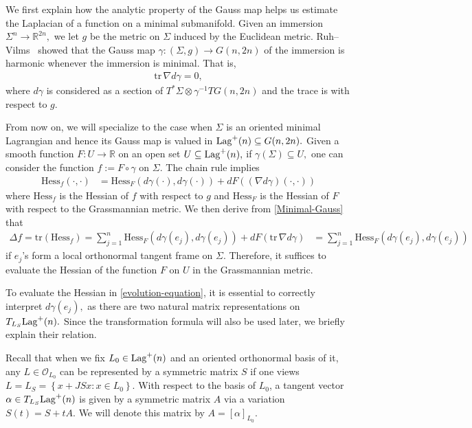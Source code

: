 \documentclass[11pt]{amsart}
\numberwithin{equation}{section}
\theoremstyle{definition}
\theoremstyle{definition}
\newcommand{\set}[1]{\left\{#1\right\}}
\newcommand{\pr}[1]{\left(#1\right)}
\newcommand{\bb}[1]{\mathbb{#1}} \newcommand{\td}[1]{\widetilde{#1}}
\newcommand{\tr}{\text{tr}}
\newcommand{\D}{\Delta}
\newcommand{\Hess}{\text{Hess}}
\newcommand{\n}{\nabla}
\newcommand{\sbst}{\subseteq}
\begin{document}
We first explain how the analytic property of the Gauss map helps us estimate the Laplacian of a function on a minimal submanifold.
Given an immersion $\Sigma^n\to\bb R^{2n},$ we let $g$ be the metric on $\Sigma$ induced by the Euclidean metric. 
Ruh--Vilms~\cite{RV} showed that the Gauss map $\gamma\colon \pr{\Sigma,g}\to G(n,2n)$ of the immersion is harmonic whenever the immersion is minimal.
That is,
\begin{align}\label{Minimal-Gauss}
\tr\, \n d\gamma = 0,
\end{align}
where $d\gamma$ is considered as a section of $T^*\Sigma\otimes \gamma^{-1} TG(n,2n)$ and the trace is with respect to $g.$



From now on, we will specialize to the case when $\Sigma$ is an oriented minimal Lagrangian and hence its Gauss map is valued in ${\rm Lag}^+(n)\sbst G(n,2n).$
Given a smooth function $F\colon U\to \bb R$ on an open set $U\sbst {\rm Lag}^+ (n),$ if $\gamma(\Sigma)\sbst U,$ one can consider the function $f:=F\circ \gamma$ on $\Sigma.$ 
The chain rule implies
\begin{align*}
\Hess_f(\cdot,\cdot)
& = \Hess_F \pr{d\gamma(\cdot), d\gamma (\cdot)}
+ dF\pr{\pr{\n d\gamma}(\cdot,\cdot)}
\end{align*}
where $\Hess_f$ is the Hessian of $f$ with respect to $g$ and $\Hess_F$ is the Hessian of $F$ with respect to the Grassmannian metric.
We then derive from \eqref{Minimal-Gauss} that 
\begin{equation}\label{evolution-equation}
\begin{split}    
\D f
= \tr\pr{\Hess_f}
= \sum_{j=1}^n \Hess_F \pr{d\gamma(e_j), d\gamma (e_j)} + dF\pr{\tr\, \n d\gamma}
& = \sum_{j=1}^n \Hess_F \pr{d\gamma(e_j), d\gamma (e_j)}
\end{split}
\end{equation}
if $e_j$'s form a local orthonormal tangent frame on $\Sigma.$
Therefore, it suffices to evaluate the Hessian of the function $F$ on $U$ in the Grassmannian metric.


To evaluate the Hessian in \eqref{evolution-equation}, it is essential to correctly interpret $d\gamma(e_j),$ as there are two natural matrix representations on $T_{L_S}{\rm Lag}^+(n).$
Since the transformation formula will also be used later, we briefly explain their relation.

Recall that when we fix $L_0\in {\rm Lag}^+(n)$ and an oriented orthonormal basis of it, any $L\in\mathcal O_{L_0}$ can be represented by a symmetric matrix $S$ if one views $L=L_S=\set{x+JSx: x\in L_0}.$
With respect to the basis of $L_0$, a tangent vector $\alpha\in T_{L_S}{\rm Lag}^+(n)$ is given by a symmetric matrix $A$ via a variation $S(t)=S+tA.$
We will denote this matrix by $A=[\alpha]_{L_0}.$
\end{document}
